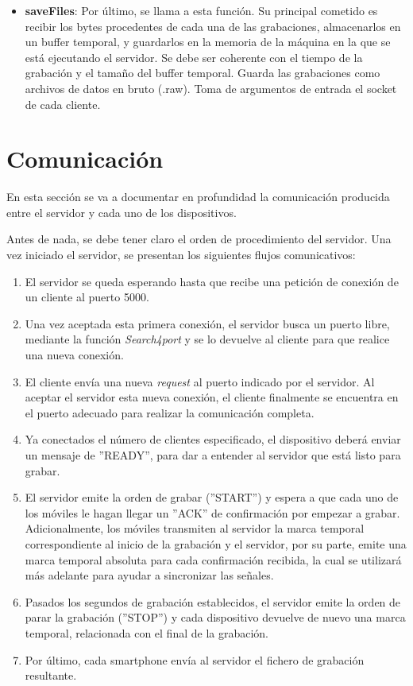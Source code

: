 \documentclass[a4paper,11pt]{book}
\begin{document}
\begin{itemize}
				\item \textbf{saveFiles}: Por último, se llama a esta función. Su principal cometido es recibir los bytes procedentes de cada una de las grabaciones, almacenarlos en un buffer temporal, y guardarlos en la memoria de la máquina en la que se está ejecutando el servidor. Se debe ser coherente con el tiempo de la grabación y el tamaño del buffer temporal. Guarda las grabaciones como archivos de datos en bruto (.raw). Toma de argumentos de entrada el socket de cada cliente.
				\end{itemize}

				
				
		\section{Comunicación}
		En esta sección se va a documentar en profundidad la comunicación producida entre el servidor y cada uno de los dispositivos.
		
		Antes de nada, se debe tener claro el orden de procedimiento del servidor. Una vez iniciado el servidor, se presentan los siguientes flujos comunicativos:
		\begin{enumerate}
		\item El servidor se queda esperando hasta que recibe una petición de conexión de un cliente al puerto 5000.
		\item Una vez aceptada esta primera conexión, el servidor busca un puerto libre, mediante la función \textit{Search4port} y se lo devuelve al cliente para que realice una nueva conexión.
		\item El cliente envía una nueva \textit{request} al puerto indicado por el servidor. Al aceptar el servidor esta nueva conexión, el cliente finalmente se encuentra en el puerto adecuado para realizar la comunicación completa.
		\item Ya conectados el número de clientes especificado, el dispositivo deberá enviar un mensaje de ''READY'', para dar a entender al servidor que está listo para grabar.
		\item El servidor emite la orden de grabar (''START'') y espera a que cada uno de los móviles le hagan llegar un ''ACK'' de confirmación por empezar a grabar. Adicionalmente, los móviles transmiten al servidor la marca temporal correspondiente al inicio de la grabación y el servidor, por su parte, emite una marca temporal absoluta para cada confirmación recibida, la cual se utilizará más adelante para ayudar a sincronizar las señales.
		\item Pasados los segundos de grabación establecidos, el servidor emite la orden de parar la grabación (''STOP'') y cada dispositivo devuelve de nuevo una marca temporal, relacionada con el final de la grabación.
		\item Por último, cada smartphone envía al servidor el fichero de grabación resultante.
		\end{enumerate}
			
\end{document}
